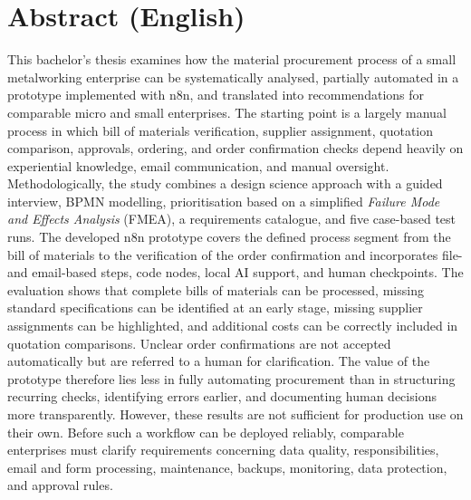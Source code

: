 \documentclass[a4paper,12pt]{article}
\begin{document}
\clearpage
\section*{Abstract (English)}
This bachelor’s thesis examines how the material procurement process of a small metalworking enterprise can be systematically analysed, partially automated in a prototype implemented with n8n, and translated into recommendations for comparable micro and small enterprises. The starting point is a largely manual process in which bill of materials verification, supplier assignment, quotation comparison, approvals, ordering, and order confirmation checks depend heavily on experiential knowledge, email communication, and manual oversight. Methodologically, the study combines a design science approach with a guided interview, BPMN modelling, prioritisation based on a simplified \textit{Failure Mode and Effects Analysis} (FMEA), a requirements catalogue, and five case-based test runs. The developed n8n prototype covers the defined process segment from the bill of materials to the verification of the order confirmation and incorporates file- and email-based steps, code nodes, local AI support, and human checkpoints. The evaluation shows that complete bills of materials can be processed, missing standard specifications can be identified at an early stage, missing supplier assignments can be highlighted, and additional costs can be correctly included in quotation comparisons. Unclear order confirmations are not accepted automatically but are referred to a human for clarification. The value of the prototype therefore lies less in fully automating procurement than in structuring recurring checks, identifying errors earlier, and documenting human decisions more transparently. However, these results are not sufficient for production use on their own. Before such a workflow can be deployed reliably, comparable enterprises must clarify requirements concerning data quality, responsibilities, email and form processing, maintenance, backups, monitoring, data protection, and approval rules.

\clearpage
\begingroup
\setlength{\parskip}{0pt}
\tableofcontents
\endgroup
\clearpage

\listoffigures
{}
\clearpage

\listoftables
{}
\clearpage
\end{document}
